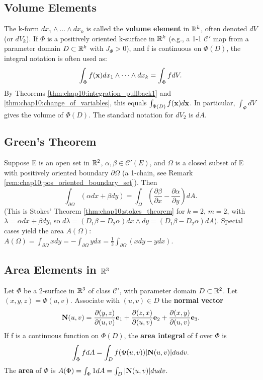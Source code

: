 \subsection*{Volume Elements}
\label{sec:chap10:volume_elements}

The k-form $dx_1 \wedge \dots \wedge dx_k$ is called the
\textbf{volume element} in $\mathbb{R}^k$, often denoted $dV$ (or $dV_k$). If
$\Phi$ is a positively oriented k-surface in $\mathbb{R}^k$ (e.g., a 1-1
  $\mathcal{C}'$ map from a parameter domain $D \subset \mathbb{R}^k$ with
$J_\Phi > 0$), and f is continuous on $\Phi(D)$, the integral
notation is often used as:
\[
  \int_\Phi f(\mathbf{x}) dx_1 \wedge \dots \wedge dx_k = \int_\Phi f dV.
\]
By Theorems \ref{thm:chap10:integration_pullback1} and
\ref{thm:chap10:change_of_variables}, this equals $\int_{\Phi(D)}
f(\mathbf{x}) d\mathbf{x}$. In particular, $\int_\Phi dV$ gives the
volume of $\Phi(D)$. The standard notation for $dV_2$ is $dA$.

\subsection*{Green's Theorem}
\label{sec:chap10:greens_theorem}

Suppose E is an open set in $\mathbb{R}^2$, $\alpha, \beta \in
\mathcal{C}'(E)$, and $\Omega$ is a closed subset of E with
positively oriented boundary $\partial \Omega$ (a 1-chain, see Remark
\ref{rem:chap10:pos_oriented_boundary_set}). Then
\[
  \int_{\partial \Omega} (\alpha dx + \beta dy) = \int_\Omega \left(
    \frac{\partial \beta}{\partial x} - \frac{\partial \alpha}{\partial
  y} \right) dA.
\]
(This is Stokes' Theorem \ref{thm:chap10:stokes_theorem} for $k=2$,
  $m=2$, with $\lambda = \alpha dx + \beta dy$, so $d\lambda =
(D_1\beta - D_2\alpha) dx \wedge dy = (D_1\beta - D_2\alpha) dA$).
Special cases yield the area $A(\Omega)$: $A(\Omega) = \int_{\partial
\Omega} x dy = - \int_{\partial \Omega} y dx = \frac{1}{2}
\int_{\partial \Omega} (x dy - y dx)$.

\subsection*{Area Elements in $\mathbb{R}^3$}
\label{sec:chap10:area_elements_R3}

Let $\Phi$ be a 2-surface in $\mathbb{R}^3$ of class $\mathcal{C}'$, with
parameter domain $D \subset \mathbb{R}^2$. Let $(x, y, z) = \Phi(u, v)$.
Associate with $(u, v) \in D$ the \textbf{normal vector}
\[
  \mathbf{N}(u, v) = \frac{\partial(y, z)}{\partial(u, v)} \mathbf{e}_1 +
  \frac{\partial(z, x)}{\partial(u, v)} \mathbf{e}_2 +
  \frac{\partial(x, y)}{\partial(u, v)} \mathbf{e}_3.
\]
If f is a continuous function on $\Phi(D)$, the \textbf{area
integral} of f over $\Phi$ is
\[
  \int_\Phi f dA = \int_D f(\Phi(u, v)) |\mathbf{N}(u, v)| du dv.
\]
The \textbf{area} of $\Phi$ is $A(\Phi) = \int_\Phi 1 dA = \int_D
|\mathbf{N}(u, v)| du dv$.

